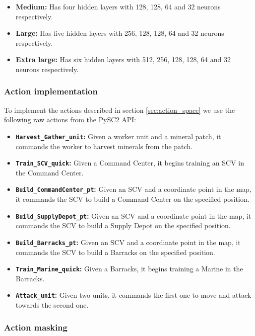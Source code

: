\begin{itemize}
    \item \textbf{Medium:} Has four hidden layers with 128, 128, 64 and 32 neurons respectively.
    \item \textbf{Large:} Has five hidden layers with 256, 128, 128, 64 and 32 neurons respectively.
    \item \textbf{Extra large:} Has six hidden layers with 512, 256, 128, 128, 64 and 32 neurons respectively.
\end{itemize}

\subsubsection*{Action implementation}

To implement the actions described in section \ref{sec:action_space} we use the following raw actions from the PySC2 API:

\begin{itemize}
    \item \textbf{\texttt{Harvest\_Gather\_unit}:} Given a worker unit and a mineral patch, it commands the worker to harvest minerals from the patch.
    \item \textbf{\texttt{Train\_SCV\_quick}:} Given a Command Center, it begins training an SCV in the Command Center.
    \item \textbf{\texttt{Build\_CommandCenter\_pt}:} Given an SCV and a coordinate point in the map, it commands the SCV to build a Command Center on the specified position.
    \item \textbf{\texttt{Build\_SupplyDepot\_pt}:} Given an SCV and a coordinate point in the map, it commands the SCV to build a Supply Depot on the specified position.
    \item \textbf{\texttt{Build\_Barracks\_pt}:} Given an SCV and a coordinate point in the map, it commands the SCV to build a Barracks on the specified position.
    \item \textbf{\texttt{Train\_Marine\_quick}:} Given a Barracks, it begins training a Marine in the Barracks.
    \item \textbf{\texttt{Attack\_unit}:} Given two units, it commands the first one to move and attack towards the second one.
\end{itemize}

\subsubsection*{Action masking}

